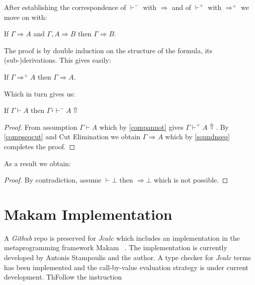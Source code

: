 After establishing the correspondence of $\vdash^{-}$ with $\Rightarrow$ and of $\vdash^{+}$ with $\Rightarrow^{+}$ we move on with:
\begin{theorem}
	If $\Gamma\Rightarrow A$ and $\Gamma,A\Rightarrow B$ then $\Gamma\Rightarrow B$.
\end{theorem}
The proof is by double induction on the structure of the formula, its (sub-)derivations. This gives easily:
\begin{theorem}
	If $\Gamma\Rightarrow^{+}A$ then $\Gamma\Rightarrow A$.
	
\end{theorem}
Which in turn gives us:
\begin{theorem}
	\label{normalization}
	If $\Gamma\vdash A$ then $\Gamma^{\downarrow}\vdash^{-} A\Uparrow$
\end{theorem}
\begin{proof}
	From assumption $\Gamma \vdash A$ which by \ref{compannot} gives $\Gamma\vdash^{+} A\Uparrow$. By \ref{compseqcut} and Cut  Elimination we obtain $\Gamma\Rightarrow A$ which by  \ref{soundnseq} completes the proof.
\end{proof}
As a result we obtain:
\begin{proof}
	By contradiction, assume $\vdash\bot$ then $\Rightarrow \bot$ which is not possible.
\end{proof}
\chapter{Makam Implementation}
A \textit{Github} repo is preserved for $Jcalc$ which includes an implementation in the
metaprogramming framework Makam ~\cite{stampoulis}. The implementation is currently developed by Antonis Stampoulis and
the author. A type checker for $Jcalc$ terms has been implemented and the call-by-value evaluation
strategy is under current development. ThFollow the instruction 